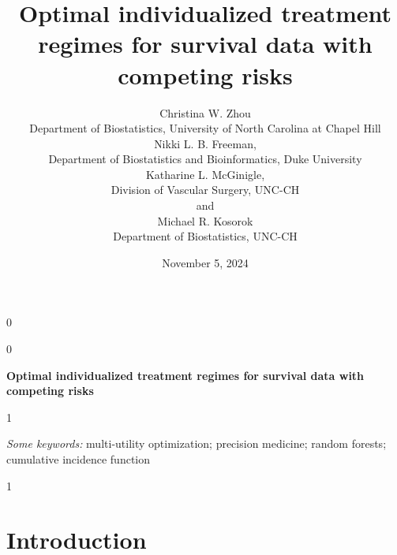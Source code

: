 \documentclass[12pt]{article}
\theoremstyle{plain} %
\newcommand{\blind}{0}
\newcommand{\sectionABSTRACT}{1}
\newcommand{\sectionINTRO}{1}
\begin{document}
%

\def\spacingset#1{\renewcommand{\baselinestretch}%
{#1}\small\normalsize} \spacingset{1}


\blind
{
  \title{\bf Optimal individualized treatment regimes for survival data with competing risks}
  \author{Christina W. Zhou
    \hspace{.2cm}\\
        Department of Biostatistics, University of North Carolina at Chapel Hill\\
    Nikki L. B. Freeman, \\
    Department of Biostatistics and Bioinformatics, Duke University\\
    Katharine L. McGinigle, \\
    Division of Vascular Surgery,
    UNC-CH\\ and\\
    Michael R. Kosorok\\
    Department of Biostatistics, UNC-CH}
    \date{November 5, 2024}
  \maketitle
} \fi

\blind
{
  \bigskip
  \bigskip
  \bigskip
  \begin{center}
    {\LARGE\bf Optimal individualized treatment regimes for survival data with competing risks}
\end{center}
  \medskip
} \fi

\sectionABSTRACT{
\bigskip
\begin{abstract}

\end{abstract}

\noindent%
{\it Some keywords:} multi-utility optimization; precision medicine; random forests; cumulative incidence function
\vfill
\newpage
} \fi

\sectionINTRO{
\section{Introduction}
\label{sec:intro}

} \fi
\end{document}
